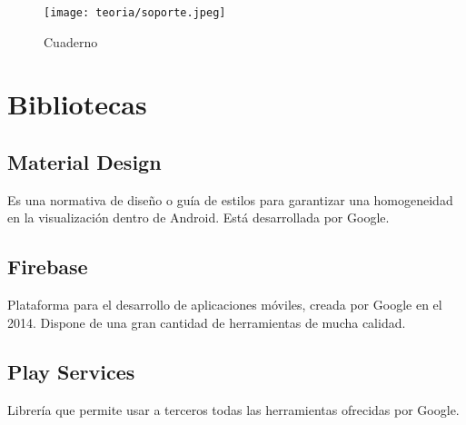 \begin{figure}[H]
	\centering
	\texttt{[image: teoria/soporte.jpeg]}
	\caption{Cuaderno}\label{fig:soporte}
\end{figure}

\section{Bibliotecas}

\subsection{Material Design}
Es una normativa de diseño o guía de estilos para garantizar una homogeneidad en la visualización dentro de Android. Está desarrollada por Google.

\subsection{Firebase}
Plataforma para el desarrollo de aplicaciones móviles, creada por Google en el 2014. Dispone de una gran cantidad de herramientas de mucha calidad.

\subsection{Play Services }
Librería que permite usar a terceros todas las herramientas ofrecidas por Google.